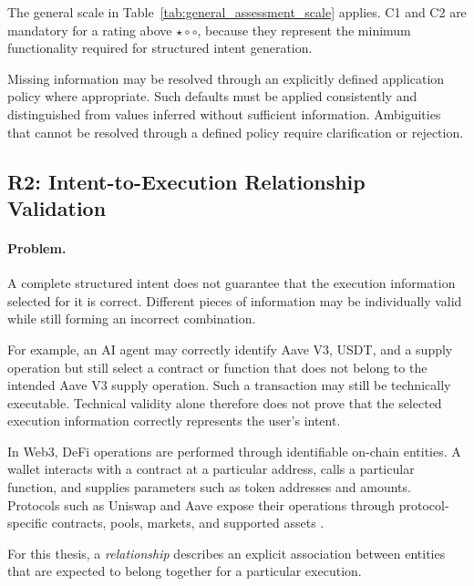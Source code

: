 
The general scale in Table~\ref{tab:general_assessment_scale} applies.
C1 and C2 are mandatory for a rating above
$\star\circ\circ$, because they represent the minimum functionality required for structured intent generation.


Missing information may be resolved through an explicitly
defined application policy where appropriate. Such defaults
must be applied consistently and distinguished from values
inferred without sufficient information. Ambiguities that
cannot be resolved through a defined policy require
clarification or rejection.


\subsection{R2: Intent-to-Execution Relationship Validation}
\label{subsec:r2_execution_relationship}

\paragraph{Problem.}

A complete structured intent does not guarantee that the execution information
selected for it is correct. Different pieces of information may be individually
valid while still forming an incorrect combination.

For example, an AI agent may correctly identify Aave V3, USDT, and a supply
operation but still select a contract or function that does not belong to the
intended Aave V3 supply operation. Such a transaction may still be technically executable. Technical validity
alone therefore does not prove that the selected execution information
correctly represents the user's intent.

In Web3, DeFi operations are performed through identifiable on-chain entities.
A wallet interacts with a contract at a particular address, calls a particular
function, and supplies parameters such as token addresses and amounts.
Protocols such as Uniswap and Aave expose their operations through
protocol-specific contracts, pools, markets, and supported assets
\cite{uniswapDocs,aaveV3OverviewDocs}.

For this thesis, a \textit{relationship} describes an explicit association
between entities that are expected to belong together for a particular
execution.

